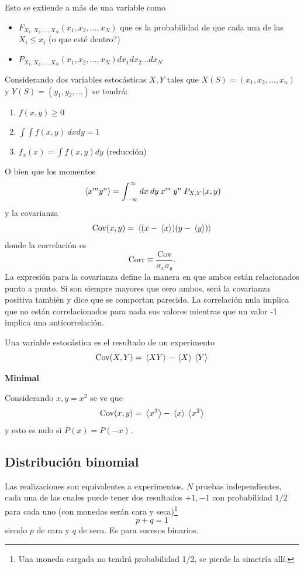 \documentclass[10pt,oneside]{CBFT_book}
\begin{document}
Esto se extiende a más de una variable como
\begin{itemize}
 \item $F_{X_1,X_2,...,X_N}(x_1,x_2,...,x_N)$ que es la probabilidad de que
 cada una de las $X_i \leq x_i$ (o que esté dentro?)
 \item $P_{X_1,X_2,...,X_N}(x_1,x_2,...,x_N) dx_1 dx_2 ... dx_N$
\end{itemize}

Considerando dos variables estocásticas $X,Y$ tales que 
$X(S)=(x_1,x_2,...,x_n)$ y $Y(S)=(y_1,y_2,...)$
se tendrá:
\begin{enumerate}
 \item $ f(x,y) \geq 0 $
 \item $ \int \int f(x,y) \: dx dy = 1 $
 \item $ f_x(x) = \int f(x,y) dy $ (reducción)
\end{enumerate}

O bien que los momentos
\[
	\:\left\langle x^m y^n \right\rangle = \int_{-\infty}^\infty dx \: dy \: x^m \: y^n \: P_{X,Y}(x,y)
\]
y la covarianza
\[
	\text{Cov}(x,y) = \:\left\langle  (x - \:\left\langle x \right\rangle) (y - \:\left\langle y \right\rangle) \right\rangle
\]
donde la correlación es
\[
	\text{Corr} \equiv \frac{\text{Cov}}{\sigma_x \sigma_y }.
\]
La expresión para la covarianza define la manera en que ambos están relacionados
punto a punto. Si son siempre mayores que cero ambos, será la covarianza positiva
también y dice que se comportan parecido. La correlación nula implica que no están
correlacionados para nada sus valores mientras que un valor -1 implica una
anticorrelación.

Una variable estocástica es el resultado de un experimento
\[
	\text{Cov}(X,Y) = \:\left\langle XY \right\rangle - \:\left\langle X \right\rangle \:\left\langle Y \right\rangle
\]

\begin{ejemplo}{\bf Minimal}

Considerando $x,y=x^2$ se ve que
\[
	\text{Cov}(x,y) =  \:\left\langle x^3 \right\rangle - \:\left\langle x \right\rangle\:\left\langle x^2 \right\rangle
\]
y esto es nulo si $P(x)=P(-x)$.
 
\end{ejemplo}


\subsection{Distribución binomial}

Las realizaciones son equivalentes a experimentos. $N$ pruebas independientes, cada una
de las cuales puede tener dos resultados $+1,-1$ con probabilidad $1/2$ para cada uno 
(con monedas serán cara y seca)\footnote{Una moneda cargada no tendrá probabilidad 1/2, se pierde
la simetría allí.}
\[
	p + q = 1
\]
siendo $p$ de cara y $q$ de seca. 
Es para sucesos binarios.
\end{document}
